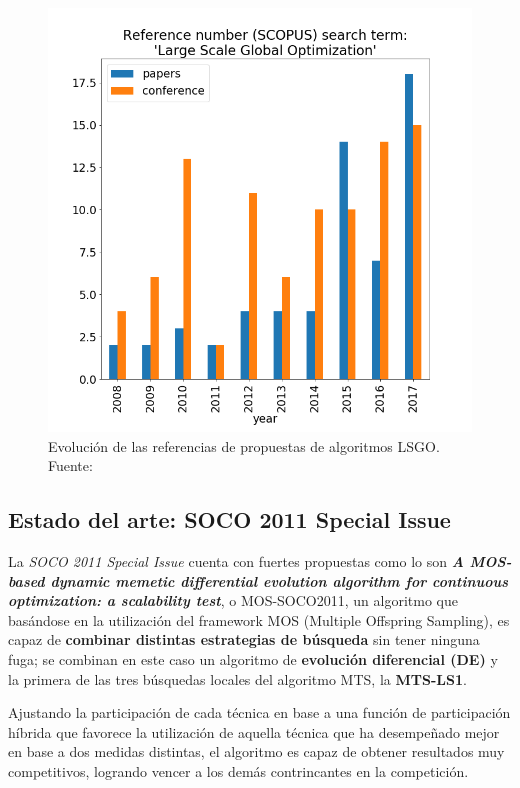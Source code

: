 \begin{figure}[h]
	\centering
	\includegraphics[scale=0.5]{imagenes/LSGO-Evolution}
	\caption{Evolución de las referencias de propuestas de algoritmos LSGO. Fuente: \cite{WCCI-SHADEILS}}
	\label{fig:LSGO-Evolution}
\end{figure}

\subsection{Estado del arte: SOCO 2011 Special Issue}
La \textit{SOCO 2011 Special Issue} cuenta con fuertes propuestas como lo son \textbf{\textit{A MOS-based dynamic memetic differential evolution algorithm for continuous optimization: a scalability test}}\cite{MOS2010}, o MOS-SOCO2011, un algoritmo que basándose en la utilización del framework MOS (Multiple Offspring Sampling), es capaz de \textbf{combinar distintas estrategias de búsqueda} sin tener ninguna fuga; se combinan en este caso un algoritmo de \textbf{evolución diferencial (DE)} y la primera de las tres búsquedas locales del algoritmo MTS\cite{MTS-LSGO}, la \textbf{MTS-LS1}.

Ajustando la participación de cada técnica en base a una función de participación híbrida que favorece la utilización de aquella técnica que ha desempeñado mejor en base a dos medidas distintas, el algoritmo es capaz de obtener resultados muy competitivos, logrando vencer a los demás contrincantes en la competición.
 
